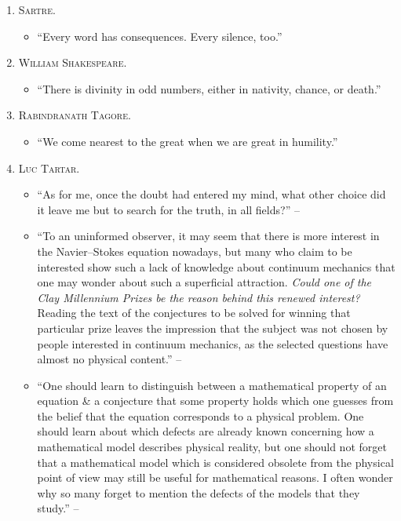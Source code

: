 \documentclass{article}
\begin{document}
\begin{enumerate}
\begin{itemize}
	\end{itemize}
	\item \textsc{Sartre.}
	\begin{itemize}
		\item ``Every word has consequences. Every silence, too.''
	\end{itemize}	
	\item \textsc{William Shakespeare.}
	\begin{itemize}
		\item ``There is divinity in odd numbers, either in nativity, chance, or death.''
	\end{itemize}
	\item \textsc{Rabindranath Tagore.}
	\begin{itemize}
		\item ``We come nearest to the great when we are great in humility.''
	\end{itemize}
	\item \textsc{Luc Tartar.}
	\begin{itemize}
		\item ``As for me, once the doubt had entered my mind, what other choice did it leave me but to search for the truth, in all fields?'' -- \cite{Tartar2006}
		\item ``To an uninformed observer, it may seem that there is more interest in the Navier--Stokes equation nowadays, but many who claim to be interested show such a lack of knowledge about continuum mechanics that one may wonder about such a superficial attraction. \textit{Could one of the Clay Millennium Prizes be the reason behind this renewed interest?} Reading the text of the conjectures to be solved for winning that particular prize leaves the impression that the subject was not chosen by people interested in continuum mechanics, as the selected questions have almost no physical content.'' -- \cite[Preface, p. vii]{Tartar2006}		
		\item ``One should learn to distinguish between a mathematical property of an equation \& a conjecture that some property holds which one guesses from the belief that the equation corresponds to a physical problem. One should learn about which defects are already known concerning how a mathematical model describes physical reality, but one should not forget that a mathematical model which is considered obsolete from the physical point of view may still be useful for mathematical reasons. I often wonder why so many forget to mention the defects of the models that they study.'' -- \cite[Preface, p. vii]{Tartar2006}		

\end{itemize}
\end{enumerate}
\end{document}
